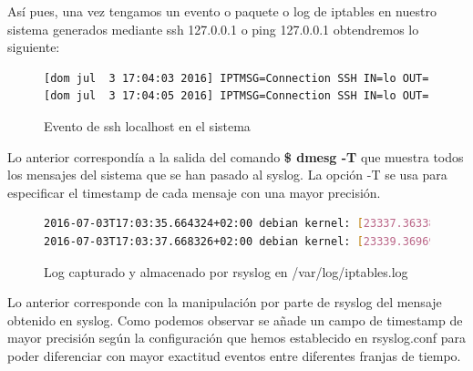 Así pues, una vez tengamos un evento o paquete o log de iptables en nuestro sistema generados mediante ssh 127.0.0.1 o ping 127.0.0.1 obtendremos lo siguiente:

\begin{figure}[H]
\begin{lstlisting}[language=bash, breaklines=true]
[dom jul  3 17:04:03 2016] IPTMSG=Connection SSH IN=lo OUT= MAC=00:00:00:00:00:00:00:00:00:00:00:00:08:00 SRC=127.0.0.1 DST=127.0.0.1 LEN=60 TOS=0x00 PREC=0x00 TTL=64 ID=39454 DF PROTO=TCP SPT=47706 DPT=22 WINDOW=43690 RES=0x00 SYN URGP=0
[dom jul  3 17:04:05 2016] IPTMSG=Connection SSH IN=lo OUT= MAC=00:00:00:00:00:00:00:00:00:00:00:00:08:00 SRC=127.0.0.1 DST=127.0.0.1 LEN=60 TOS=0x00 PREC=0x00 TTL=64 ID=39455 DF PROTO=TCP SPT=47706 DPT=22 WINDOW=43690 RES=0x00 SYN URGP=0
\end{lstlisting}
\caption{Evento de ssh localhost en el sistema}
\end{figure}

Lo anterior correspondía a la salida del comando \textbf{\$ dmesg -T} que muestra todos los mensajes del sistema que se han pasado al syslog. La opción -T se usa para especificar el timestamp de cada mensaje con una mayor precisión.\\

\begin{figure}[H]
\begin{lstlisting}[language=bash, breaklines=true]
2016-07-03T17:03:35.664324+02:00 debian kernel: [23337.363387] IPTMSG=Connection SSH IN=lo OUT= MAC=00:00:00:00:00:00:00:00:00:00:00:00:08:00 SRC=127.0.0.1 DST=127.0.0.1 LEN=60 TOS=0x00 PREC=0x00 TTL=64 ID=39454 DF PROTO=TCP SPT=47706 DPT=22 WINDOW=43690 RES=0x00 SYN URGP=0
2016-07-03T17:03:37.668326+02:00 debian kernel: [23339.369692] IPTMSG=Connection SSH IN=lo OUT= MAC=00:00:00:00:00:00:00:00:00:00:00:00:08:00 SRC=127.0.0.1 DST=127.0.0.1 LEN=60 TOS=0x00 PREC=0x00 TTL=64 ID=39455 DF PROTO=TCP SPT=47706 DPT=22 WINDOW=43690 RES=0x00 SYN URGP=0
\end{lstlisting}
\caption{Log capturado y almacenado por rsyslog en /var/log/iptables.log}
\end{figure}

Lo anterior corresponde con la manipulación por parte de rsyslog del mensaje obtenido en syslog. Como podemos observar se añade un campo de timestamp de mayor precisión según la configuración que hemos establecido en rsyslog.conf para poder diferenciar con mayor exactitud eventos entre diferentes franjas de tiempo. \\

